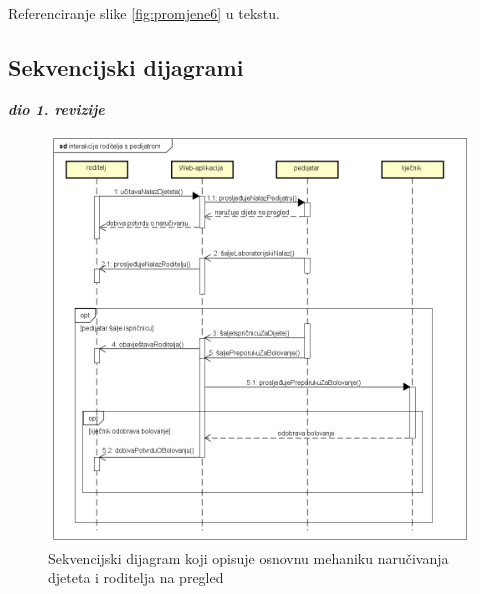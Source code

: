 					Referenciranje slike \ref{fig:promjene6} u tekstu.
					
				
			\subsection{Sekvencijski dijagrami}
				
				\textbf{\textit{dio 1. revizije}}\\
				
				\begin{figure}[H]
					\includegraphics[width=\textwidth]{slike/SDrplW.PNG} %
					\caption{Sekvencijski dijagram koji opisuje osnovnu mehaniku naručivanja djeteta i roditelja na pregled}
					\label{fig:promjene7} %
				\end{figure}
				
